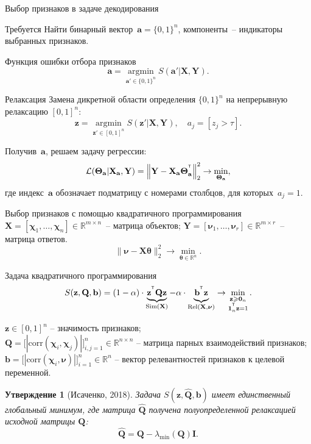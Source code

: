 \documentclass[10pt]{beamer}
\renewcommand{\geq}{\ensuremath{\geqslant}}
\newcommand{\ba}{\mathbf{a}}
\newcommand{\bz}{\mathbf{z}}
\newcommand{\bI}{\mathbf{I}}
\newcommand{\bQ}{\mathbf{Q}}
\newcommand{\bX}{\mathbf{X}}
\newcommand{\bY}{\mathbf{Y}}
\newcommand{\bbR}{\mathbb{R}}
\newcommand{\bchi}{\boldsymbol{\chi}}
\newcommand{\bnu}{\boldsymbol{\nu}}
\newcommand{\btheta}{\boldsymbol{\theta}}
\newcommand{\bTheta}{\boldsymbol{\Theta}}
\newcommand{\T}{^{\text{\tiny\sffamily\upshape\mdseries T}}}
\newcommand{\bOne}{\boldsymbol{1}}
\newcommand{\bZero}{\boldsymbol{0}}
\newcommand{\argmin}{\mathop{\arg \min}\limits}
\newtheorem{statement}{Утверждение}
\begin{document}
\begin{frame}{Выбор признаков в задаче декодирования}
\begin{block}{Требуется}
Найти бинарный вектор~$\ba = \{0, 1\}^n$, компоненты~-- индикаторы выбранных признаков. 
\end{block}
\begin{block}{Функция ошибки отбора признаков}
	\vspace{-0.2cm}
\[
\ba = \argmin_{\ba' \in \{0, 1\}^n} S(\ba' | \bX, \bY).
\]
\vspace{-0.5cm}
\end{block}
\begin{block}{Релаксация}
	Замена дикретной области определения $\{0, 1\}^n$ на непрерывную релаксацию $[0, 1]^n$:
	\[
	\bz = \argmin_{\bz' \in [0, 1]^n} S(\bz' | \bX, \bY), \quad 
	a_j = [z_j > \tau].
\]
\end{block}
Получив~$\ba$, решаем задачу регрессии:
\[
\mathcal{L}(\bTheta_{\ba} | \bX_{\ba}, \bY) = {\left\| \mathbf{Y} - \bX_{\ba}\bTheta^{\T}_{\ba} \right\| }_2^2 \rightarrow\min_{\bTheta_{\ba}},
\]
где индекс~$\ba$ обозначает подматрицу с номерами столбцов, для которых~$a_j = 1$.
\end{frame}
\begin{frame}{Выбор признаков с помощью квадратичного программирования}
	$\bX = [\bchi_1, \dots, \bchi_n] \in \bbR^{m \times n}$~-- матрица объектов; $\bY = [\bnu_1, \dots, \bnu_r] \in \bbR^{m \times r}$~-- матрица ответов.
	\[
	\| \bnu - \bX \btheta\|_2^2 \rightarrow\min_{\btheta \in \bbR^{n}}.
	\]
	\vspace{-0.3cm}
	\begin{block}{Задача квадратичного программирования}
	\vspace{-0.3cm}
	\[
	S(\bz, \bQ, \mathbf{b}) = (1 - \alpha) \cdot \underbrace{\bz^{\T} \bQ \bz}_{\text{Sim}(\bX)} - \alpha \cdot \underbrace{\vphantom{()} \mathbf{b}^{\T} \bz}_{\text{Rel}(\bX, \bnu)} \rightarrow \min_{\substack{\bz \geq \bZero_n \\ \bOne_n^{\T} \bz=1}}.
	\]
	\vspace{-0.5cm}
	\end{block}
		$\bz \in [0, 1]^n$ -- значимость признаков; \\
		$\bQ = \bigl[\left|\text{corr}(\bchi_i, \bchi_j)\right|\bigr]_{i,j=1}^n \in \bbR^{n \times n}$ -- матрица парных взаимодействий признаков; \\
		$\mathbf{b} = \bigl[\left|\text{corr}(\bchi_i, \bnu)\right|\bigr]_{i=1}^n \in \bbR^n$ -- вектор релевантностей признаков к целевой переменной. 
\begin{statement}[Исаченко, 2018]
	Задача $S(\bz,  \hat{\bQ}, \mathbf{b})$ имеет единственный глобальный минимум, где матрица $\hat{\bQ}$ получена полуопределенной релаксацией исходной матрицы $\bQ$:
	\begin{equation*}
		\hat{\bQ} = \bQ - \lambda_{\min}(\bQ) \bI.
	\end{equation*}
\end{statement}
\end{frame}
\end{document}

